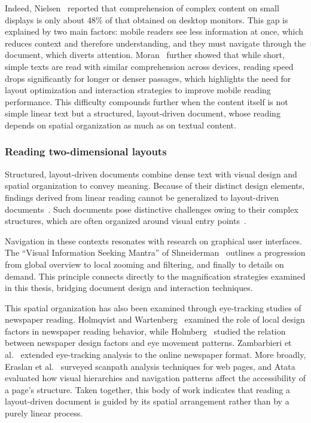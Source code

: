 Indeed, Nielsen~\cite{Nielsen2011} reported that comprehension of complex content on small displays is only about 48\% of that obtained on desktop monitors. This gap is explained by two main factors: mobile readers see less information at once, which reduces context and therefore understanding, and they must navigate through the document, which diverts attention. Moran~\cite{moran2016reading} further showed that while short, simple texts are read with similar comprehension across devices, reading speed drops significantly for longer or denser passages, which highlights the need for layout optimization and interaction strategies to improve mobile reading performance. This difficulty compounds further when the content itself is not simple linear text but a structured, layout-driven document, whose reading depends on spatial organization as much as on textual content.

\subsubsection{Reading two-dimensional layouts}
\label{sec:sota-reading-layouts}

Structured, layout-driven documents combine dense text with visual design and spatial organization to convey meaning. Because of their distinct design elements, findings derived from linear reading cannot be generalized to layout-driven documents~\cite{ozretic_dosen_key_2018, hollander_e-reader_2011}. Such documents pose distinctive challenges owing to their complex structures, which are often organized around visual entry points~\cite{holsanova_entry_2006}.

Navigation in these contexts resonates with research on graphical user interfaces. The ``Visual Information Seeking Mantra'' of Shneiderman~\cite{shneiderman1996} outlines a progression from global overview to local zooming and filtering, and finally to details on demand. This principle connects directly to the magnification strategies examined in this thesis, bridging document design and interaction techniques.

This spatial organization has also been examined through eye-tracking studies of newspaper reading. Holmqvist and Wartenberg~\cite{holmqvist_role_2005} examined the role of local design factors in newspaper reading behavior, while Holmberg~\cite{holmberg_eye_2004} studied the relation between newspaper design factors and eye movement patterns. Zambarbieri et al.~\cite{zambarbieri_eye_2008} extended eye-tracking analysis to the online newspaper format. More broadly, Eraslan et al.~\cite{eraslan_eye_2015} surveyed scanpath analysis techniques for web pages, and Atata~\cite{atata_evaluating_2025} evaluated how visual hierarchies and navigation patterns affect the accessibility of a page's structure. Taken together, this body of work indicates that reading a layout-driven document is guided by its spatial arrangement rather than by a purely linear process.

